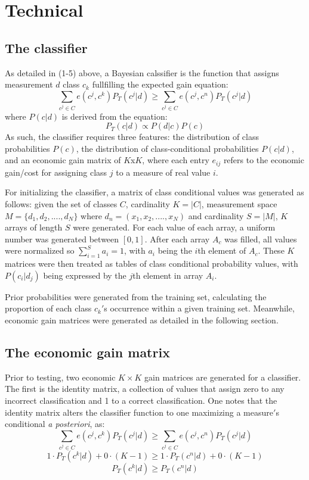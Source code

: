 \documentclass[10pt, conference]{IEEEtran}
\begin{document}
\section{Technical}
\subsection{The classifier}
As detailed in (1-5) above, a Bayesian calssifier is the function that assigns measurement $d$ class $c_k$ fullfilling the expected gain equation:
\begin{equation*}
\sum_{c^j \in C}{e(c^j, c^k)P_T(c^j|d)} \geq \sum_{c^j \in C}{e(c^j,c^n)P_T(c^j|d)}
\end{equation*}
where $P(c|d)$ is derived from the equation:
 \begin{equation*}
P_T(c|d) \propto P(d|c)P(c)
\end{equation*}
 As such, the classifier requires three features: the distribution of class probabilities $P(c)$, the distribution of class-conditional probabilities $P(c|d)$, and an economic gain matrix of $K$x$K$, where each entry $e_{ij}$ refers to the economic gain/cost for assigning class  $j$ to a measure of real value $i$. 
	
	For initializing the classifier, a matrix of class conditional values was generated as follows: given the set of classes $C$, cardinality $K=|C|$, measurement space $M= \{d_1,d_2,....,d_N\}$ where $d_n = (x_1,x_2,....,x_N)$ and cardinality $S=|M|$,  $K$ arrays of length $S$ were generated. For each value of each array, a uniform number was generated between $[0,1]$. After each array $A_c$ was filled, all values were normalized so $\sum_{i=1}^{S}a_i=1$, with $a_i$ being the $i$th element of $A_c$. These $K$ matrices were then treated as tables of class conditional probability values, with $P(c_i|d_j)$ being expressed by the $j$th element in array $A_i$. 
	
	Prior probabilities were generated from the training set, calculating the proportion of each class $c_k'$s occurrence within a given training set. Meanwhile, economic gain matrices were generated as detailed in the following section.
\subsection{The economic gain matrix}
	Prior to testing, two economic $K \times K$ gain matrices are generated for a classifier. The first is the identity matrix, a collection of values that assign zero to any incorrect classification and 1 to a correct classification. One notes that the identity matrix alters the classifier function to one maximizing a measure$'$s conditional \textit{a posteriori}, as:
\begin{equation*}
\sum_{c^j \in C}{e(c^j, c^k)P_T(c^j|d)} \geq \sum_{c^j \in C}{e(c^j,c^n)P_T(c^j|d)} 
\end{equation*}
\begin{equation*}
1 \cdot P_T(c^k|d) + 0 \cdot (K-1) \geq 1 \cdot P_T(c^n|d) + 0 \cdot (K-1)
\end{equation*}
\begin{equation}
P_T(c^k|d) \geq P_T(c^n|d)
\end{equation}
\end{document}
